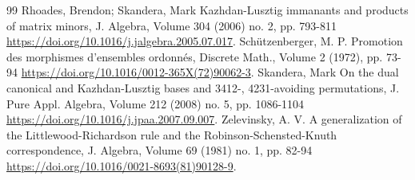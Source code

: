 \documentclass[10pt,a4paper]{article}
\theoremstyle{definition}
\numberwithin{equation}{section}
\begin{document}
\begin{thebibliography}{99}
 Rhoades, Brendon; Skandera, Mark Kazhdan-Lusztig immanants and products of matrix minors, J. Algebra, Volume 304 (2006) no. 2, pp. 793-811 \url{https://doi.org/10.1016/j.jalgebra.2005.07.017}.
 Schützenberger, M. P. Promotion des morphismes d’ensembles ordonnés, Discrete Math., Volume 2 (1972), pp. 73-94 \url{https://doi.org/10.1016/0012-365X(72)90062-3}.
 Skandera, Mark On the dual canonical and Kazhdan-Lusztig bases and 3412-, 4231-avoiding permutations, J. Pure Appl. Algebra, Volume 212 (2008) no. 5, pp. 1086-1104 \url{https://doi.org/10.1016/j.jpaa.2007.09.007}.
 Zelevinsky, A. V. A generalization of the Littlewood-Richardson rule and the Robinson-Schensted-Knuth correspondence, J. Algebra, Volume 69 (1981) no. 1, pp. 82-94 \url{https://doi.org/10.1016/0021-8693(81)90128-9}.
\end{thebibliography}
\end{document}
